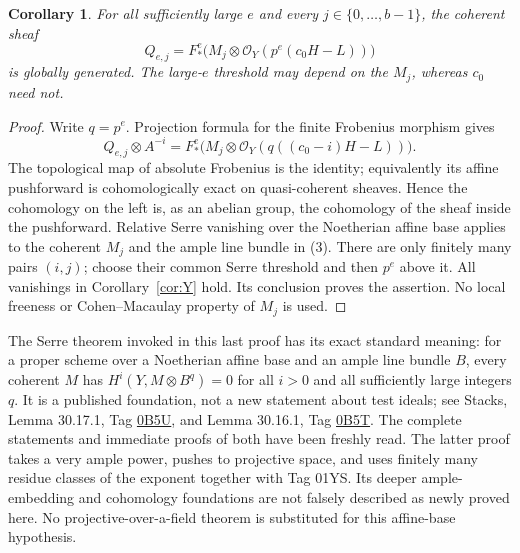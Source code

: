 \documentclass[11pt]{article}
\newtheorem{corollary}[theorem]{Corollary}
\newcommand{\OO}{\mathcal O}
\begin{document}
\begin{corollary}\label{cor:Frob}
For all sufficiently large $e$ and every $j\in\{0,\ldots,b-1\}$,
the coherent sheaf
\[
 Q_{e,j}=F_*^e\bigl(M_j\otimes
                \OO_Y(p^e(c_0H-L))\bigr)
\]
is globally generated. The large-$e$ threshold may depend on the
$M_j$, whereas $c_0$ need not.
\end{corollary}
\begin{proof}
Write $q=p^e$. Projection formula for the finite Frobenius morphism gives
\[
 Q_{e,j}\otimes A^{-i}
 =F_*^e\bigl(M_j\otimes\OO_Y(q((c_0-i)H-L))\bigr).
\]
The topological map of absolute Frobenius is the identity; equivalently
its affine pushforward is cohomologically exact on quasi-coherent
sheaves. Hence the cohomology on the left is, as an abelian group,
the cohomology of the sheaf inside the pushforward. Relative Serre
vanishing over the Noetherian affine base applies to the coherent $M_j$
and the ample line bundle in (3). There are only finitely many pairs
$(i,j)$; choose their common Serre threshold and then $p^e$ above it.
All vanishings in Corollary~\ref{cor:Y} hold. Its conclusion proves
the assertion. No local freeness or Cohen--Macaulay property of $M_j$
is used.
\end{proof}

The Serre theorem invoked in this last proof has its exact standard
meaning: for a proper scheme over a Noetherian affine base and an ample
line bundle $B$, every coherent $M$ has
$H^i(Y,M\otimes B^q)=0$ for all $i>0$ and all sufficiently large
integers $q$. It is a published foundation, not a new statement about
test ideals; see Stacks, Lemma 30.17.1, Tag
\href{https://stacks.math.columbia.edu/tag/0B5U}{0B5U}, and Lemma
30.16.1, Tag \href{https://stacks.math.columbia.edu/tag/0B5T}{0B5T}.
The complete statements and immediate proofs of both have been freshly
read. The latter proof takes a very ample power, pushes to projective
space, and uses finitely many residue classes of the exponent together
with Tag 01YS. Its deeper ample-embedding and cohomology foundations
are not falsely described as newly proved here. No projective-over-a-field theorem is
substituted for this affine-base hypothesis.
\end{document}
